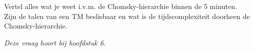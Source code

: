 \begin{question}
  Vertel alles wat je weet i.v.m. de Chomsky-hierarchie binnen de 5 minuten. \\
  Zijn de talen van een TM beslisbaar en wat is de tijdscomplexiteit doorheen de Chomsky-hierarchie.
\end{question}

\textit{Deze vraag hoort bij hoofdstuk 6.}
